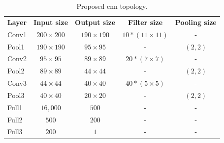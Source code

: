 \begin{table}[!h]
	\centering
	\begin{tabular}{|l||c|c|c|c|}
		\hline
		\textbf{Layer} & \textbf{Input size} & \textbf{Output size} & \textbf{Filter size} & \textbf{Pooling size} \\ \hhline{=#====}
		
		Conv1 & $200\times 200$ & $190\times190$ & $10*(11\times11)$ & -\\ \hline
		
		Pool1 & $190\times190$ & $95\times95$ & - & $(2,2)$\\ \hline
		
		Conv2 & $95\times95$ & $89\times89$ & $20*(7\times7)$ & - \\ \hline
		
		Pool2 & $89\times89$ & $44\times44$ & - & $(2,2)$\\ \hline
		
		Conv3 & $44\times44$ & $40\times40$ & $40*(5\times5)$ & - \\ \hline
		
		Pool3 & $40\times40$ & $20\times20$ & - & $(2,2)$\\ \hline
		
		Full1 & $16,000$ & $500$ & - & - \\ \hline
		
		Full2 & $500$ & $200$ & - & - \\ \hline
		
		Full3 & $200$ & $1$ & - & - \\ \hline
	\end{tabular}
	\caption{Proposed \gls{cnn} topology.}
	\label{tab:cnnTopo}
\end{table}







